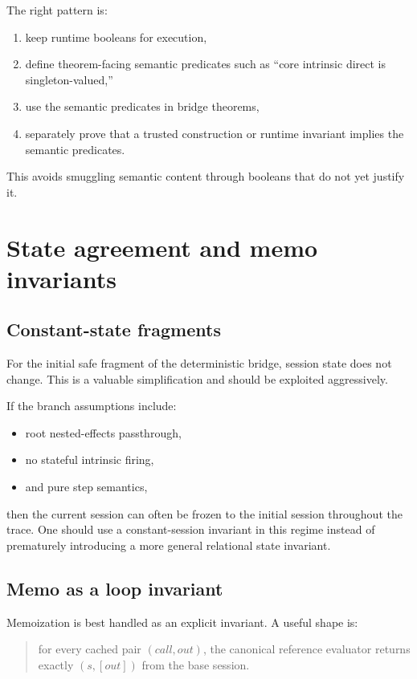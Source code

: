\documentclass[11pt]{article}
\begin{document}
The right pattern is:

\begin{enumerate}
  \item keep runtime booleans for execution,
  \item define theorem-facing semantic predicates such as ``core intrinsic direct is singleton-valued,''
  \item use the semantic predicates in bridge theorems,
  \item separately prove that a trusted construction or runtime invariant implies the semantic predicates.
\end{enumerate}

This avoids smuggling semantic content through booleans that do not yet justify it.

\section{State agreement and memo invariants}

\subsection{Constant-state fragments}

For the initial safe fragment of the deterministic bridge, session state does not change. This is a valuable simplification and should be exploited aggressively.

If the branch assumptions include:

\begin{itemize}
  \item root nested-effects passthrough,
  \item no stateful intrinsic firing,
  \item and pure step semantics,
\end{itemize}

then the current session can often be frozen to the initial session throughout the trace. One should use a constant-session invariant in this regime instead of prematurely introducing a more general relational state invariant.

\subsection{Memo as a loop invariant}

Memoization is best handled as an explicit invariant. A useful shape is:

\begin{quote}
for every cached pair $(call, out)$, the canonical reference evaluator returns exactly $(s,[out])$ from the base session.
\end{quote}
\end{document}
